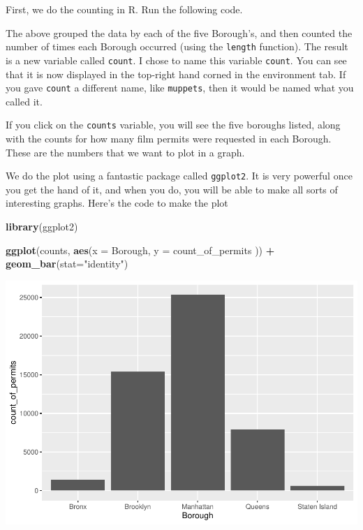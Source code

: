 \documentclass[]{book}
\newenvironment{Shaded}{\begin{snugshade}}{\end{snugshade}}
\newcommand{\KeywordTok}[1]{\textcolor[rgb]{0.13,0.29,0.53}{\textbf{#1}}}
\newcommand{\DataTypeTok}[1]{\textcolor[rgb]{0.13,0.29,0.53}{#1}}
\newcommand{\StringTok}[1]{\textcolor[rgb]{0.31,0.60,0.02}{#1}}
\newcommand{\OperatorTok}[1]{\textcolor[rgb]{0.81,0.36,0.00}{\textbf{#1}}}
\newcommand{\NormalTok}[1]{#1}
\begin{document}
First, we do the counting in R. Run the following code.

\begin{Shaded}
\end{Shaded}

The above grouped the data by each of the five Borough's, and then
counted the number of times each Borough occurred (using the
\texttt{length} function). The result is a new variable called
\texttt{count}. I chose to name this variable \texttt{count}. You can
see that it is now displayed in the top-right hand corned in the
environment tab. If you gave \texttt{count} a different name, like
\texttt{muppets}, then it would be named what you called it.

If you click on the \texttt{counts} variable, you will see the five
boroughs listed, along with the counts for how many film permits were
requested in each Borough. These are the numbers that we want to plot in
a graph.

We do the plot using a fantastic package called \texttt{ggplot2}. It is
very powerful once you get the hand of it, and when you do, you will be
able to make all sorts of interesting graphs. Here's the code to make
the plot

\begin{Shaded}
\begin{Highlighting}[]
\KeywordTok{library}\NormalTok{(ggplot2)}

\KeywordTok{ggplot}\NormalTok{(counts, }\KeywordTok{aes}\NormalTok{(}\DataTypeTok{x =}\NormalTok{ Borough, }\DataTypeTok{y =}\NormalTok{ count_of_permits )) }\OperatorTok{+}
\StringTok{  }\KeywordTok{geom_bar}\NormalTok{(}\DataTypeTok{stat=}\StringTok{"identity"}\NormalTok{)}
\end{Highlighting}
\end{Shaded}

\includegraphics{Statistics_Lab_files/figure-latex/1borough-1.pdf}
\end{document}
